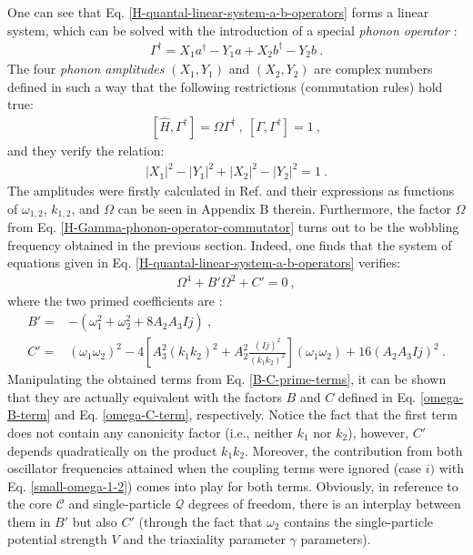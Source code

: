 One can see that Eq. \ref{H-quantal-linear-system-a-b-operators} forms a linear system, which can be solved with the introduction of a special \emph{phonon operator} \cite{raduta2017semiclassical,raduta2018wobbling}:
\begin{align}
    \Gamma^\dagger=X_1a^\dagger-Y_1a+X_2b^\dagger-Y_2b\ .
\end{align}
The four \emph{phonon amplitudes} $(X_1,Y_1)$ and $(X_2,Y_2)$ are complex numbers defined in such a way that the following restrictions (commutation rules) hold true:
\begin{align}
    \left[\hat{H},\Gamma^\dagger\right]=\Omega\Gamma^\dagger\ ,\ \left[\Gamma,\Gamma^\dagger\right]=1\ ,
    \label{H-Gamma-phonon-operator-commutator}
\end{align}
and they verify the relation:
\begin{align}
    \left|X_1\right|^2-\left|Y_1\right|^2+\left|X_2\right|^2-\left|Y_2\right|^2=1\ .
\end{align}
The amplitudes were firstly calculated in Ref. \cite{raduta2007semiclassical} and their expressions as functions of $\omega_{1,2}$, $k_{1,2}$, and $\Omega$ can be seen in Appendix B therein. Furthermore, the factor $\Omega$ from Eq. \ref{H-Gamma-phonon-operator-commutator} turns out to be the wobbling frequency obtained in the previous section. Indeed, one finds that the system of equations given in Eq. \ref{H-quantal-linear-system-a-b-operators} verifies:
\begin{align}
    \Omega^4+B'\Omega^2+C'=0\ ,
\end{align}
where the two primed coefficients are \cite{raduta2020approach}:
\begin{align}
    B'=&-\left(\omega_1^2+\omega_2^2+8A_2A_3Ij\right)\ ,\nonumber\\
    C'=&(\omega_1\omega_2)^2-4\left[A_3^2(k_1k_2)^2+A_2^2\frac{(Ij)^2}{\left(k_1k_2\right)^2}\right]\left(\omega_1\omega_2\right)+16(A_2A_3Ij)^2\ .
    \label{B-C-prime-terms}
\end{align}
Manipulating the obtained terms from Eq. \ref{B-C-prime-terms}, it can be shown that they are actually equivalent with the factors $B$ and $C$ defined in Eq. \ref{omega-B-term} and Eq. \ref{omega-C-term}, respectively. Notice the fact that the first term does not contain any canonicity factor (i.e., neither $k_1$ nor $k_2$), however, $C'$ depends quadratically on the product $k_1k_2$. Moreover, the contribution from both oscillator frequencies attained when the coupling terms were ignored (case $i)$ with Eq. \ref{small-omega-1-2}) comes into play for both terms. Obviously, in reference to the core $\mathscr{C}$ and single-particle $\mathcal{Q}$ degrees of freedom, there is an interplay between them in $B'$ but also $C'$ (through the fact that $\omega_2$ contains the single-particle potential strength $V$ and the triaxiality parameter $\gamma$ parameters).

